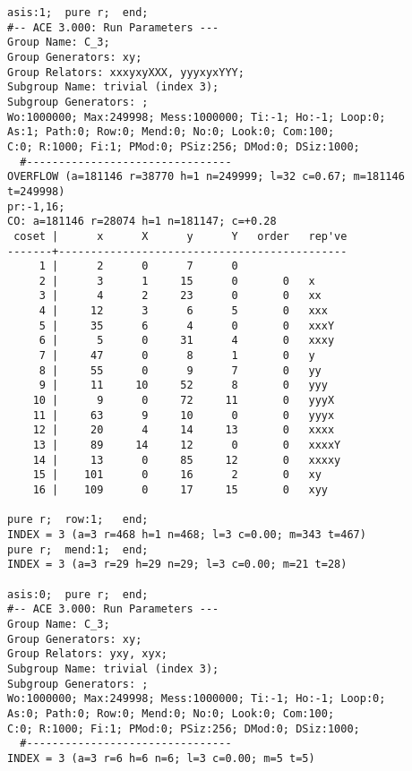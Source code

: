 \begin{verbatim}
asis:1;  pure r;  end;  
#-- ACE 3.000: Run Parameters ---
Group Name: C_3;
Group Generators: xy;
Group Relators: xxxyxyXXX, yyyxyxYYY;
Subgroup Name: trivial (index 3);
Subgroup Generators: ;
Wo:1000000; Max:249998; Mess:1000000; Ti:-1; Ho:-1; Loop:0;
As:1; Path:0; Row:0; Mend:0; No:0; Look:0; Com:100;
C:0; R:1000; Fi:1; PMod:0; PSiz:256; DMod:0; DSiz:1000;
  #--------------------------------
OVERFLOW (a=181146 r=38770 h=1 n=249999; l=32 c=0.67; m=181146 t=249998)
pr:-1,16;
CO: a=181146 r=28074 h=1 n=181147; c=+0.28
 coset |      x      X      y      Y   order   rep've
-------+---------------------------------------------
     1 |      2      0      7      0
     2 |      3      1     15      0       0   x
     3 |      4      2     23      0       0   xx
     4 |     12      3      6      5       0   xxx
     5 |     35      6      4      0       0   xxxY
     6 |      5      0     31      4       0   xxxy
     7 |     47      0      8      1       0   y
     8 |     55      0      9      7       0   yy
     9 |     11     10     52      8       0   yyy
    10 |      9      0     72     11       0   yyyX
    11 |     63      9     10      0       0   yyyx
    12 |     20      4     14     13       0   xxxx
    13 |     89     14     12      0       0   xxxxY
    14 |     13      0     85     12       0   xxxxy
    15 |    101      0     16      2       0   xy
    16 |    109      0     17     15       0   xyy

pure r;  row:1;   end;
INDEX = 3 (a=3 r=468 h=1 n=468; l=3 c=0.00; m=343 t=467)
pure r;  mend:1;  end;
INDEX = 3 (a=3 r=29 h=29 n=29; l=3 c=0.00; m=21 t=28)

asis:0;  pure r;  end;  
#-- ACE 3.000: Run Parameters ---
Group Name: C_3;
Group Generators: xy;
Group Relators: yxy, xyx;
Subgroup Name: trivial (index 3);
Subgroup Generators: ;
Wo:1000000; Max:249998; Mess:1000000; Ti:-1; Ho:-1; Loop:0;
As:0; Path:0; Row:0; Mend:0; No:0; Look:0; Com:100;
C:0; R:1000; Fi:1; PMod:0; PSiz:256; DMod:0; DSiz:1000;
  #--------------------------------
INDEX = 3 (a=3 r=6 h=6 n=6; l=3 c=0.00; m=5 t=5)
\end{verbatim}\ev

